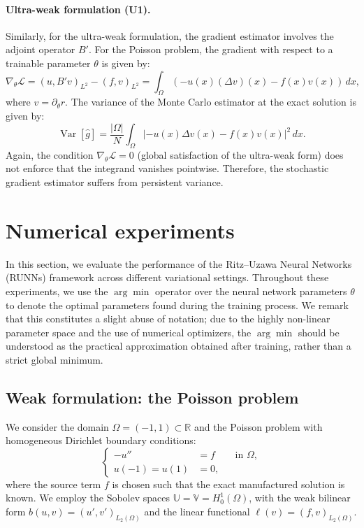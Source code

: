 \documentclass{article}
\theoremstyle{definition}
\begin{document}
\paragraph{Ultra-weak formulation (U1).}
Similarly, for the ultra-weak formulation, the gradient estimator involves the adjoint operator $B'$. For the Poisson problem, the gradient with respect to a trainable parameter $\theta$ is given by:
\begin{equation}
    \nabla_\theta \mathcal{L} = (u,B'v)_{L^2}-(f,v)_{L^2} = \int_{\Omega} \left(- u(x)(\Delta v)(x) - f(x)v(x) \right) \, dx,
\end{equation}
where $v = \partial_\theta r$. The variance of the Monte Carlo estimator at the exact solution is given by:
\begin{equation}
    \operatorname{Var}[\hat{g}] = \frac{|\Omega|}{N} \int_{\Omega} | -u(x)\Delta v(x) - f(x)v(x) |^2 \, dx.
\end{equation}
Again, the condition $\nabla_\theta \mathcal{L}  = 0$ (global satisfaction of the ultra-weak form) does not enforce that the integrand vanishes pointwise. Therefore, the stochastic gradient estimator suffers from persistent variance.

\section{Numerical experiments}\label{section:Numerical_experiments}

In this section, we evaluate the performance of the Ritz--Uzawa Neural Networks (RUNNs) framework across different variational settings.  Throughout these experiments, we use the $\arg\min$ operator over the neural network parameters $\theta$ to denote the optimal parameters found during the training process. We remark that this constitutes a slight abuse of notation; due to the highly non-linear parameter space and the use of numerical optimizers, the $\arg\min$ should be understood as the practical approximation obtained after training, rather than a strict global minimum.

\subsection{Weak formulation: the Poisson problem}

We consider the domain $\Omega = (-1, 1) \subset \mathbb{R}$ and the Poisson problem with homogeneous Dirichlet boundary conditions:
\begin{equation}
\left\{
\begin{aligned}
    -u'' &= f & &\text{in } \Omega, \\
    u(-1) = u(1) &= 0, &
\end{aligned}
\right.
\label{eq:Elliptic-ode-weak}
\end{equation}
where the source term $f$ is chosen such that the exact manufactured solution is known. We employ the Sobolev spaces $\mathbb{U}=\mathbb{V}=H^1_{0}(\Omega)$, with the weak bilinear form $b(u,v)=(u',v')_{L_2(\Omega)}$ and the linear functional $\ell(v)=(f,v)_{L_2(\Omega)}$.
\end{document}
